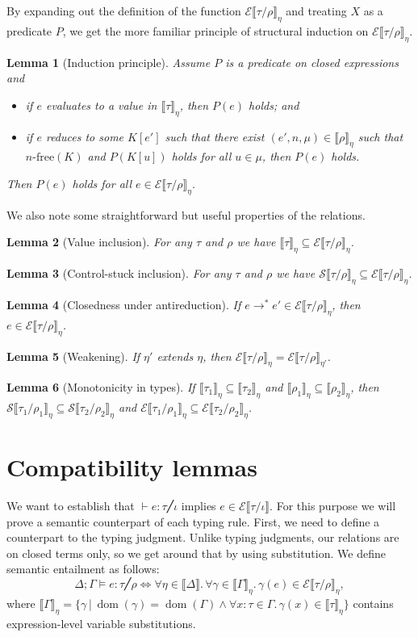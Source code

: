 \documentclass[a4paper, 12pt]{report}
\newcommand{\E}{\mathcal{E}}
\renewcommand{\S}{\mathcal{S}}
\newcommand{\Free}{\textrm{-}\mathrm{free}}
\DeclareMathOperator{\dom}{dom}
\newcommand{\+}{\enspace}
\newtheorem{lemma}{Lemma}
\begin{document}
By expanding out the definition of the function $\E⟦τ/ρ⟧_η$
and treating $X$ as a predicate $P$,
we get the more familiar principle of structural induction on $\E⟦τ/ρ⟧_η$.
\begin{lemma}[Induction principle]\label{induction}
	Assume $P$ is a predicate on closed expressions and
\begin{itemize}
	\item if $e$ evaluates to a value in $⟦τ⟧_η$, then $P(e)$ holds; and
	\item if $e$ reduces to some $K[e']$ such that there exist $(e',n,μ)∈⟦ρ⟧_η$ such that $n\Free(K)$
		and $P(K[u])$ holds for all $u∈μ$, then $P(e)$ holds.
\end{itemize}
	Then $P(e)$ holds for all $e ∈ \E⟦τ/ρ⟧_η$.
\end{lemma}

We also note some straightforward but useful properties of the relations.
\begin{lemma}[Value inclusion]\label{value-inclusion}
	For any $τ$ and $ρ$ we have $⟦τ⟧_η ⊆ \E⟦τ/ρ⟧_η$.
\end{lemma}

\begin{lemma}[Control-stuck inclusion]\label{stuck-inclusion}
For any $τ$ and $ρ$ we have $\S⟦τ/ρ⟧_η ⊆ \E⟦τ/ρ⟧_η$.
\end{lemma}

\begin{lemma}[Closedness under antireduction]\label{antireduction}
If $e →^* e' ∈ \E⟦τ/ρ⟧_η$, then $e∈\E⟦τ/ρ⟧_η$.
\end{lemma}

\begin{lemma}[Weakening]\label{weakening}
	If $η'$ extends $η$,
	then $\E⟦τ/ρ⟧_η = \E⟦τ/ρ⟧_{η'}$.
\end{lemma}

\begin{lemma}[Monotonicity in types]\label{mono}
	If $⟦τ_1⟧_η ⊆ ⟦τ_2⟧_η$ and $⟦ρ_1⟧_η ⊆ ⟦ρ_2⟧_η$,
	then $\S⟦τ_1/ρ_1⟧_η ⊆ \S⟦τ_2/ρ_2⟧_η$
	and $\E⟦τ_1/ρ_1⟧_η ⊆ \E⟦τ_2/ρ_2⟧_η$.
\end{lemma}

\section{Compatibility lemmas}
We want to establish that $⊢ e : τ ╱ ι$ implies $e ∈ \E⟦τ/ι⟧$.
For this purpose we will prove a semantic counterpart of each typing rule.
First, we need to define a counterpart to the typing judgment.
Unlike typing judgments, our relations are on closed terms only,
so we get around that by using substitution.
We define semantic entailment as follows:
$$Δ;Γ ⊨ e : τ ╱ ρ ⇔ ∀η∈⟦Δ⟧.\, ∀γ∈⟦Γ⟧_η.\,γ(e) ∈ \E⟦τ/ρ⟧_η,$$
where $⟦Γ⟧_η = \{ γ │ \dom(γ) = \dom(Γ) ∧ ∀x:τ∈Γ.\,γ(x) ∈ ⟦τ⟧_η\}$ contains expression-level
variable substitutions.
\end{document}
